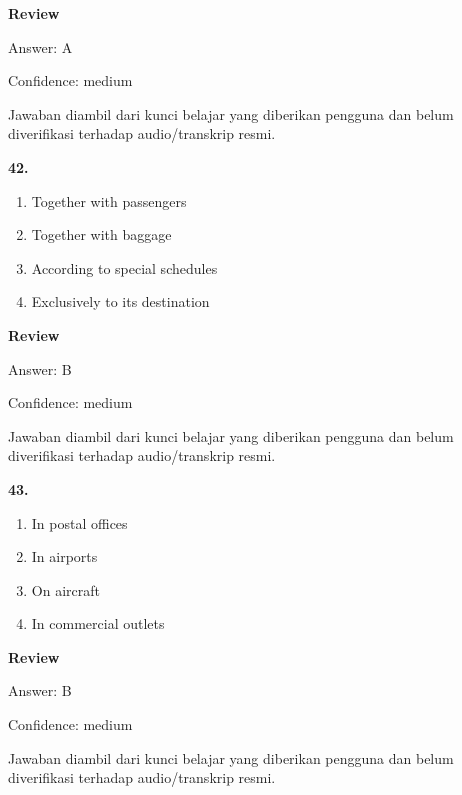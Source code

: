 \documentclass[12pt]{article}
\begin{document}
\begingroup
\setlength{\parskip}{0pt}
\setlength{\parindent}{0pt}
\textbf{Review}\par
Answer: A\par
Confidence: medium\par
Jawaban diambil dari kunci belajar yang diberikan pengguna dan belum diverifikasi terhadap audio/transkrip resmi.\par
\endgroup
\par
\vspace{0.25\baselineskip}
\noindent\textbf{42.}
\begin{enumerate}[label=(\Alph*),leftmargin=*,itemsep=0.2em]
\item Together with passengers
\item Together with baggage
\item According to special schedules
\item Exclusively to its destination
\end{enumerate}
\par
\begingroup
\setlength{\parskip}{0pt}
\setlength{\parindent}{0pt}
\textbf{Review}\par
Answer: B\par
Confidence: medium\par
Jawaban diambil dari kunci belajar yang diberikan pengguna dan belum diverifikasi terhadap audio/transkrip resmi.\par
\endgroup
\par
\vspace{0.25\baselineskip}
\noindent\textbf{43.}
\begin{enumerate}[label=(\Alph*),leftmargin=*,itemsep=0.2em]
\item In postal offices
\item In airports
\item On aircraft
\item In commercial outlets
\end{enumerate}
\par
\begingroup
\setlength{\parskip}{0pt}
\setlength{\parindent}{0pt}
\textbf{Review}\par
Answer: B\par
Confidence: medium\par
Jawaban diambil dari kunci belajar yang diberikan pengguna dan belum diverifikasi terhadap audio/transkrip resmi.\par
\endgroup
\par
\vspace{0.25\baselineskip}
\end{document}
